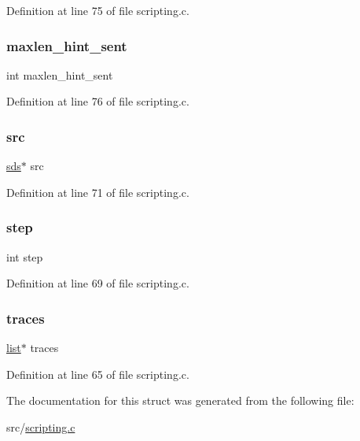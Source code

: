 Definition at line 75 of file scripting.\+c.

\mbox{\label{structldb_state_a30be56c3b354bdb2e4d39a105be4e1bd}} 
\subsubsection{\texorpdfstring{maxlen\+\_\+hint\+\_\+sent}{maxlen\_hint\_sent}}
{\footnotesize\ttfamily int maxlen\+\_\+hint\+\_\+sent}



Definition at line 76 of file scripting.\+c.

\mbox{\label{structldb_state_ae6aed5a52abc1fc9c7945db6ce185a7d}} 
\subsubsection{\texorpdfstring{src}{src}}
{\footnotesize\ttfamily \hyperlink{sds_8h_ad69abac3df4532879db9642c95f5ef6f}{sds}$\ast$ src}



Definition at line 71 of file scripting.\+c.

\mbox{\label{structldb_state_abc16e65f240ed0c8f3e876e8732c0a33}} 
\subsubsection{\texorpdfstring{step}{step}}
{\footnotesize\ttfamily int step}



Definition at line 69 of file scripting.\+c.

\mbox{\label{structldb_state_a306571a8cb6864a49170a1d0ef814347}} 
\subsubsection{\texorpdfstring{traces}{traces}}
{\footnotesize\ttfamily \hyperlink{structlist}{list}$\ast$ traces}



Definition at line 65 of file scripting.\+c.



The documentation for this struct was generated from the following file\+:\begin{DoxyCompactItemize}
\item 
src/\hyperlink{scripting_8c}{scripting.\+c}\end{DoxyCompactItemize}
